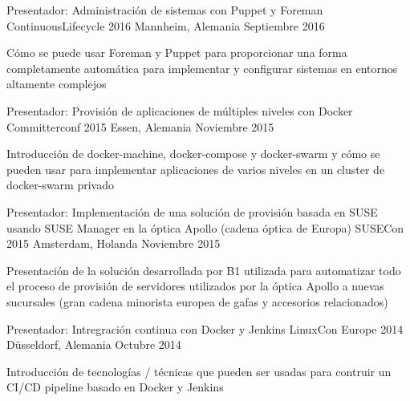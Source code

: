 \newpage


\begin{cventries}


  \cventry
    {Presentador: Administración de sistemas con Puppet y Foreman}
    {ContinuousLifecycle 2016}
    {Mannheim, Alemania}
    {Septiembre 2016}
    {
      \begin{cvitems}
        \item {Cómo se puede usar Foreman y Puppet para proporcionar una forma completamente automática para implementar y configurar sistemas en entornos altamente complejos}
      \end{cvitems}
    }
  \cventry
    {Presentador: Provisión de aplicaciones de múltiples niveles con Docker}
    {Committerconf 2015}
    {Essen, Alemania}
    {Noviembre 2015}
    {
      \begin{cvitems}
      \item {Introducción de docker-machine, docker-compose y docker-swarm y cómo se pueden usar para implementar aplicaciones de varios niveles en un cluster de docker-swarm privado}
      \end{cvitems}
    }
  \cventry
    {Presentador: Implementación de una solución de provisión basada en SUSE usando SUSE Manager en la óptica Apollo (cadena óptica de Europa)}
    {SUSECon 2015}
    {Amsterdam, Holanda}
    {Noviembre 2015}
    {
      \begin{cvitems}
      \item {Presentación de la solución desarrollada por B1 utilizada para automatizar todo el proceso de provisión de servidores utilizados por la óptica Apollo a nuevas sucursales (gran cadena minorista europea de gafas y accesorios relacionados)}
      \end{cvitems}
    }
  \cventry
    {Presentador: Intregración continua con Docker y Jenkins}
    {LinuxCon Europe 2014} %
    {Düsseldorf, Alemania} %
    {Octubre 2014} %
    {
      \begin{cvitems} %
      \item {Introducción de tecnologías / técnicas que pueden ser usadas para contruir un CI/CD pipeline basado en Docker y Jenkins}

\end{cvitems}}
\end{cventries}
